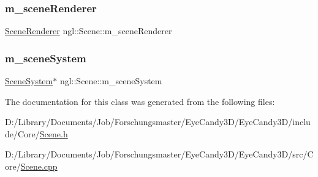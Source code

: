 \mbox{\label{classngl_1_1_scene_a5c5340f6ae9c671266009bf242f6329b}} 
\subsubsection{\texorpdfstring{m\+\_\+scene\+Renderer}{m\_sceneRenderer}}
{\footnotesize\ttfamily \mbox{\hyperlink{classngl_1_1_scene_renderer}{Scene\+Renderer}} ngl\+::\+Scene\+::m\+\_\+scene\+Renderer\hspace{0.3cm}{\ttfamily [protected]}}

\mbox{\label{classngl_1_1_scene_ab5fc913c32572b3847a0131d66c102b9}} 
\subsubsection{\texorpdfstring{m\+\_\+scene\+System}{m\_sceneSystem}}
{\footnotesize\ttfamily \mbox{\hyperlink{classngl_1_1_scene_system}{Scene\+System}}$\ast$ ngl\+::\+Scene\+::m\+\_\+scene\+System\hspace{0.3cm}{\ttfamily [protected]}}



The documentation for this class was generated from the following files\+:\begin{DoxyCompactItemize}
\item 
D\+:/\+Library/\+Documents/\+Job/\+Forschungsmaster/\+Eye\+Candy3\+D/\+Eye\+Candy3\+D/include/\+Core/\mbox{\hyperlink{_scene_8h}{Scene.\+h}}\item 
D\+:/\+Library/\+Documents/\+Job/\+Forschungsmaster/\+Eye\+Candy3\+D/\+Eye\+Candy3\+D/src/\+Core/\mbox{\hyperlink{_scene_8cpp}{Scene.\+cpp}}\end{DoxyCompactItemize}
